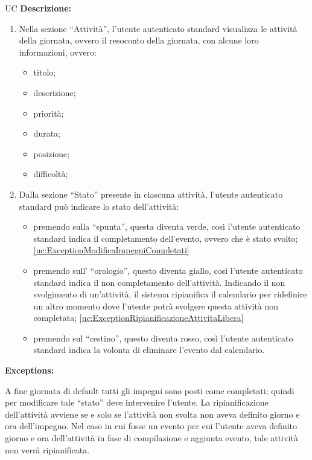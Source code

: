 \begin{listaPersonale}{UC}
    \textbf{Descrizione:}
    \begin{enumerate}
        \item Nella sezione “Attività”, l'utente autenticato standard visualizza le attività della giornata, ovvero il resoconto della giornata, con alcune loro informazioni, ovvero:
              \begin{itemize}
                  \item titolo;
                  \item descrizione;
                  \item priorità;
                  \item durata;
                  \item posizione;
                  \item difficoltà;
              \end{itemize}
        \item Dalla sezione “Stato” presente in ciascuna attività, l'utente autenticato standard può indicare lo stato dell'attività:
              \begin{itemize}
                  \item premendo sulla “spunta”, questa diventa verde, così l'utente autenticato standard indica il completamento dell'evento, ovvero che è stato svolto; \ref{uc:ExceptionModificaImpegniCompletati}
                  \item premendo sull' “orologio”, questo diventa giallo, così l'utente autenticato standard indica il non completamento dell'attività. Indicando il non svolgimento di un'attività, il sistema ripianifica il calendario per ridefinire un altro momento dove l'utente potrà svolgere questa attività non completata; \ref{uc:ExceptionRipianificazioneAttivitaLibera}
                  \item premendo sul “cestino”, questo diventa rosso, così l'utente autenticato standard indica la volonta di eliminare l'evento dal calendario.
              \end{itemize}

    \end{enumerate}



    \textbf{Exceptions:}
    \begin{enumerate}[label=\textbf{[exception \arabic{enumii}]}, ref= \textbf{[exception \arabic{enumii}]}]
         A fine giornata di default tutti gli impegni sono posti come completati; quindi per modificare tale “stato” deve intervenire l'utente.
         La ripianificazione dell'attività avviene se e solo se l'attività non svolta non aveva definito giorno e ora dell'impegno. Nel caso in cui fosse un evento per cui l'utente aveva definito giorno e ora dell'attività in fase di compilazione e aggiunta evento, tale attività non verrà ripianificata.
    \end{enumerate}


\end{listaPersonale}
